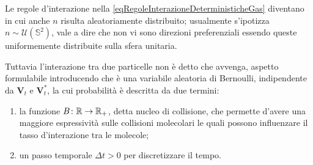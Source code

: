                 Le regole d'interazione nella \eqref{eqRegoleInterazioneDeterministicheGas} diventano
                in cui anche \(n\) risulta aleatoriamente distribuito; usualmente s'ipotizza \(n\sim\mathcal U(\mathbb S^2)\), vale a dire che non vi sono direzioni preferenziali essendo queste uniformemente distribuite sulla sfera unitaria.

                Tuttavia l'interazione tra due particelle non è detto che avvenga, aspetto formulabile introducendo 
                che è una variabile aleatoria di Bernoulli, indipendente da \(\mathbf V_t\) e \(\mathbf V^*_t\), la cui probabilità è descritta da due termini:
                
                \begin{enumerate}[
                    label=\arabic*.,
                ]
                    \item la funzione \(B\colon\mathbb R\to\mathbb R_+\), detta nucleo di collisione, che permette d'avere una maggiore espressività sulle collisioni molecolari le quali possono influenzare il tasso d'interazione tra le molecole\footnotemark{};
                    \item un passo temporale \(\Delta t>0\) per discretizzare il tempo.
                \end{enumerate}
                
